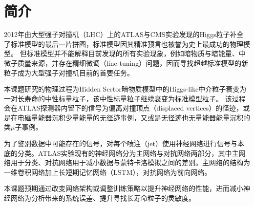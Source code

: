 
\chapter{简介}

2012年由大型强子对撞机（LHC）上的ATLAS与CMS实验发现的Higgs粒子补全了标准模型的最后一片拼图，标准模型因其精准预言也被誉为史上最成功的物理模型。
但标准模型并不能解释目前发现的所有实验现象，例如暗物质与暗能量、中微子质量来源，并存在精细微调（fine-tuning）问题，因而寻找超越标准模型的新粒子成为大型强子对撞机目前的首要任务。

本课题研究的物理过程为Hidden Sector暗物质模型中的Higgs-like中介粒子衰变为一对长寿命的中性标量粒子，该中性标量粒子继续衰变为标准模型粒子。
该过程会在ATLAS探测器内留下的信号为偏离对撞顶点（displaced vertices）的径迹，或是在电磁量能器沉积少量能量的无径迹事例，又或是无径迹也无量能器能量沉积的类$\mu$子事例。

为了鉴别数据中可能存在的信号，对每个喷注（jet）使用神经网络进行信号与本底的分类。ATLAS实验现有的神经网络分为主网络与对抗网络两部分，其中主网络用于分类、对抗网络用于减小数据与蒙特卡洛模拟之间的差别。主网络的结构为一维卷积网络加上长短期记忆网络（LSTM），对抗网络为前向网络。

本课题预期通过改变网络架构或调整训练策略以提升神经网络的性能，进而减小神经网络为分析带来的系统误差、提升寻找长寿命粒子的灵敏度。
